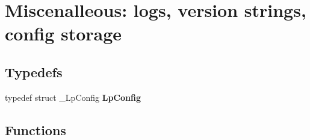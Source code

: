 \section{\-Miscenalleous\-: logs, version strings, config storage}
\label{group__misc}
\subsection*{\-Typedefs}
\begin{DoxyCompactItemize}
\item 
typedef struct \-\_\-\-Lp\-Config {\bf \-Lp\-Config}
\end{DoxyCompactItemize}
\subsection*{\-Functions}
